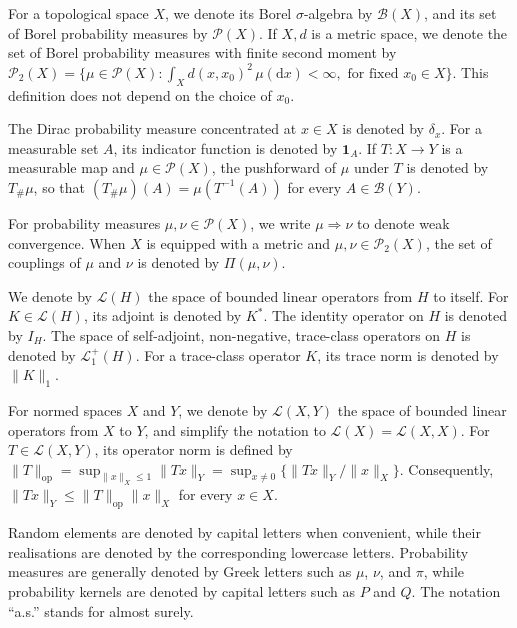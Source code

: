 For a topological space \(X\), we denote its Borel \(\sigma\)-algebra by \(\mathcal B(X)\), and its set of Borel probability measures by \(\mathcal P(X)\). If \(X,d\) is a metric space, we denote the set of Borel probability measures with finite second moment by \(\mathcal P_2(X)=\{\mu\in\mathcal P(X):\int_X d(x,x_0)^2\,\mu(\mathrm dx)<\infty,\text{ for fixed }x_0\in X\}\). This definition does not depend on the choice of \(x_0\).

The Dirac probability measure concentrated at \(x\in X\) is denoted by \(\delta_x\). For a measurable set \(A\), its indicator function is denoted by \(\mathbf 1_A\). If \(T:X\to Y\) is a measurable map and \(\mu\in\mathcal P(X)\), the pushforward of \(\mu\) under \(T\) is denoted by \(T_\#\mu\), so that \((T_\#\mu)(A)=\mu(T^{-1}(A))\) for every \(A\in\mathcal B(Y)\).

For probability measures \(\mu,\nu\in\mathcal P(X)\), we write \(\mu\Rightarrow\nu\) to denote weak convergence. When \(X\) is equipped with a metric and \(\mu,\nu\in\mathcal P_2(X)\), the set of couplings of \(\mu\) and \(\nu\) is denoted by \(\Pi(\mu,\nu)\).

We denote by \(\mathcal L(H)\) the space of bounded linear operators from \(H\) to itself. For \(K\in\mathcal L(H)\), its adjoint is denoted by \(K^*\). The identity operator on \(H\) is denoted by \(I_H\). The space of self-adjoint, non-negative, trace-class operators on \(H\) is denoted by \(\mathcal L_1^+(H)\). For a trace-class operator \(K\), its trace norm is denoted by \(\|K\|_1\).

For normed spaces \(X\) and \(Y\), we denote by \(\mathcal L(X,Y)\) the space of bounded linear operators from \(X\) to \(Y\), and simplify the notation to \(\mathcal L(X)=\mathcal L(X,X)\). For \(T\in\mathcal L(X,Y)\), its operator norm is defined by \(\|T\|_{\mathrm{op}}=\sup_{\|x\|_X\leqslant1}\|Tx\|_Y=\sup_{x\neq0}\{{\|Tx\|_Y}/{\|x\|_X}\}. \) Consequently, \(\|Tx\|_Y\leqslant\|T\|_{\mathrm{op}}\|x\|_X\) for every \(x\in X\).

Random elements are denoted by capital letters when convenient, while their realisations are denoted by the corresponding lowercase letters. Probability measures are generally denoted by Greek letters such as \(\mu\), \(\nu\), and \(\pi\), while probability kernels are denoted by capital letters such as \(P\) and \(Q\). The notation ``a.s.'' stands for almost surely.




